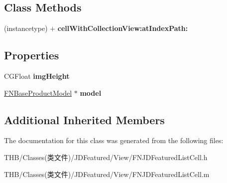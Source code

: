 \subsection*{Class Methods}
\begin{DoxyCompactItemize}
\item 
\mbox{\label{interface_f_n_j_d_featured_list_cell_acde8a0711adbc47d718f66010943560a}} 
(instancetype) + {\bfseries cell\+With\+Collection\+View\+:at\+Index\+Path\+:}
\end{DoxyCompactItemize}
\subsection*{Properties}
\begin{DoxyCompactItemize}
\item 
\mbox{\label{interface_f_n_j_d_featured_list_cell_a4302f002e44493b4f88fcab72951e556}} 
C\+G\+Float {\bfseries img\+Height}
\item 
\mbox{\label{interface_f_n_j_d_featured_list_cell_a2978e38e57739cf1a0c119776abb0e8a}} 
\mbox{\hyperlink{interface_f_n_base_product_model}{F\+N\+Base\+Product\+Model}} $\ast$ {\bfseries model}
\end{DoxyCompactItemize}
\subsection*{Additional Inherited Members}


The documentation for this class was generated from the following files\+:\begin{DoxyCompactItemize}
\item 
T\+H\+B/\+Classes(类文件)/\+J\+D\+Featured/\+View/F\+N\+J\+D\+Featured\+List\+Cell.\+h\item 
T\+H\+B/\+Classes(类文件)/\+J\+D\+Featured/\+View/F\+N\+J\+D\+Featured\+List\+Cell.\+m\end{DoxyCompactItemize}
